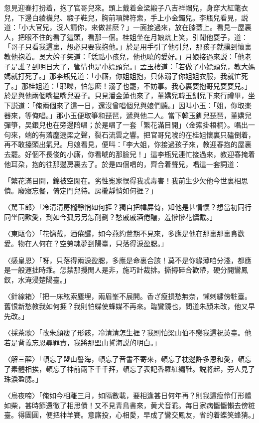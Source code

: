 忽見迎春打扮着，抱了官哥兒來。頭上戴着金梁緞子八吉祥帽兒，身穿大紅氅衣兒，下邊白綾襪兒、緞子鞋兒，胸前項牌符索，手上小金鐲兒。李瓶兒看見，説道：「小大官兒，沒人請你，來做甚麽？」一面接過來，放在膝蓋上。看見一屋裏人，把眼不住的看了這頭，看那一個。桂姐坐在月娘炕上笑，引鬦他耍子，道：「哥子只看我這裏，想必只要我抱他。」於是用手引了他引兒，那孩子就撲到懷裏教他抱着。吳大妗子笑道：「恁點小孩兒，他也曉的愛好。」月娘接過來説：「他老子是誰？到明日大了，管情也是小嫖頭兒。」孟玉樓道：「若做了小嫖頭兒，教大媽媽就打死了。」那李瓶兒道：「小廝，你姐姐抱，只休溺了你姐姐衣服，我就忙死了。」那桂姐道：「耶嚛，怕怎麽！溺了也罷，不妨事。我心裏要抱哥兒耍耍兒。」於是與他兩個嘴揾嘴兒耍子。只見潘金蓮也來了，董嬌兒韓玉釧兒下來行禮畢，坐下説道：「俺兩個來了這一日，還沒曾唱個兒與娘們聽。」因叫小玉：「姐，你取楽器來，等俺唱。」那小玉便取箏和琵琶，遞與他二人。當下韓玉釧兒琵琶，董嬌兒彈箏，吴銀兒也在旁邊陪唱；於是唱了一套「繁花滿目開」〈金索掛梧桐〉。唱出一句來，端的有落塵遶梁之聲，裂石流雲之響。把官哥兒唬的在桂姐懷裏只磕倒着，再不敢擡頭出氣兒。月娘看見，便呌：「李大姐，你接過孩子來，教迎春抱的屋裏去罷。好個不長俊的小廝，你看唬的那臉兒！」這李瓶兒連忙接過來，教迎春掩着他耳朶，抱的往那邊房裏去了。於是四個唱的，齊合着聲兒，唱這一套詞道：

「繁花滿目開，錦被空閑在。劣性寃家悮得我忒毒害！我前生少欠他今世裏相思債。廢寢忘餐，倚定門兒待。房櫳靜悄如何捱？」

〈駡玉郎〉「冷清清房櫳靜悄如何捱？獨自把幃屏倚，知他是甚情懷？想當初同行同坐同歡愛，到如今孤另另怎㓦劃？愁戚戚酒倦釃，羞慘慘花慵戴。」

〈東甌令〉「花慵戴，酒倦釃，如今燕約鶯期不見來，多應是他在那裏那裏貪歡愛。物在人何在？空勞魂夢到陽臺，只落得淚盈腮。」

〈感皇恩〉「呀，只落得兩淚盈腮，多應是命裏合該！莫不是你緣薄咱分淺，都應是一般運拙時乖。怎禁那攪閒人是非，施巧計裁排。撕撏碎合歡帶，硬分開鸞鳳釵，水淹浸楚陽臺。」

〈針線箱〉「把一床絃索塵埋，兩眉峯不展開。香ざ瘦損愁無奈，懶刺繡傍粧臺。舊恨新愁教我如何捱？我則怕蝶使蜂媒不再來。臨鸞鏡也，問道朱顔未改，他又早先改。」

〈採茶歌〉「改朱顔瘦了形骸，冷清清怎生捱？我則怕梁山伯不戀我這祝英臺。他若是背義忘恩尋罪責，我將那盟山誓海説的明白。」

〈解三酲〉「頓忘了盟山誓海，頓忘了音書不寄來，頓忘了枕邊許多恩和愛，頓忘了素體相挨，頓忘了神前兩下千千拜，頓忘了表記香羅紅繡鞋。説將起，旁人見了珠淚盈腮。」

〈烏夜啼〉「俺如今相離三月，如隔數載，要相逢甚日何年再？則我這瘦伶仃形體如柴，甚時節還徹了相思債！又不見青鳥書來，黄犬音乖。每日家病懨懨懶去傍粧臺。得團圓，便把神羊賽。意廝投，心相愛，早成了鸞交鳳友，省的着蝶笑蜂猜。」

